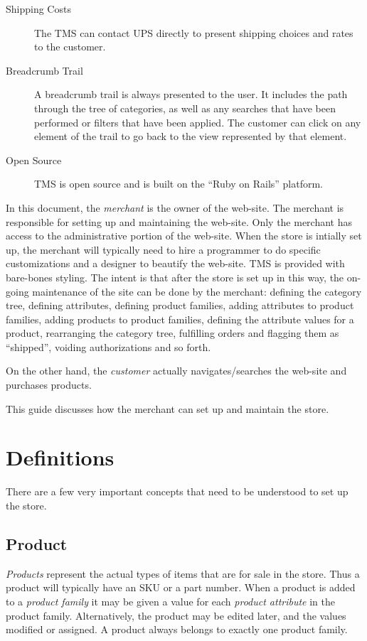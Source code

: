 \documentclass[letterpaper, 12pt]{article}
\begin{document}
\begin{description}
\item[Shipping Costs] The TMS can contact UPS directly to present shipping choices and rates to the customer.
\item[Breadcrumb Trail] A breadcrumb trail is always presented to the user.  It includes the path through the tree of categories, as well as any searches that have been performed or filters that have been applied.  The customer can click on any element of the trail to go back to the view represented by that element.
\item[Open Source] TMS is open source and is built on the ``Ruby on Rails'' platform.
\end{description}

In this document, the {\em merchant} is the owner of the web-site.  The merchant is responsible for setting up and maintaining the web-site.  Only the merchant has access to the administrative portion of the web-site.  When the store is intially set up, the merchant will typically need to hire a programmer to do specific customizations and a designer to beautify the web-site.  TMS is provided with bare-bones styling.  The intent is that after the store is set up in this way,  the on-going maintenance of the site can be done by the merchant: defining the category tree,
defining attributes, defining product families, adding attributes to product families,  adding products to product families, defining the attribute values for a product, rearranging the category tree, fulfilling orders and flagging them as ``shipped'', voiding authorizations and so forth. 

On the other hand, the {\em customer} actually navigates/searches the web-site and purchases products. 

This guide discusses how the merchant can set up and maintain the store.

\section{Definitions}
There are a few very important concepts that need to be understood to set up the store.

\subsection{Product}
{\em Products} represent the actual types of items that are for sale in the store.  Thus a product will typically have an SKU or a part number.
When a product is added to a {\em product family} it may be given a value for each {\em product attribute} in the product family.  Alternatively,
the product may be edited later, and the values modified or assigned.  A product always belongs to exactly one product family.
\end{document}

